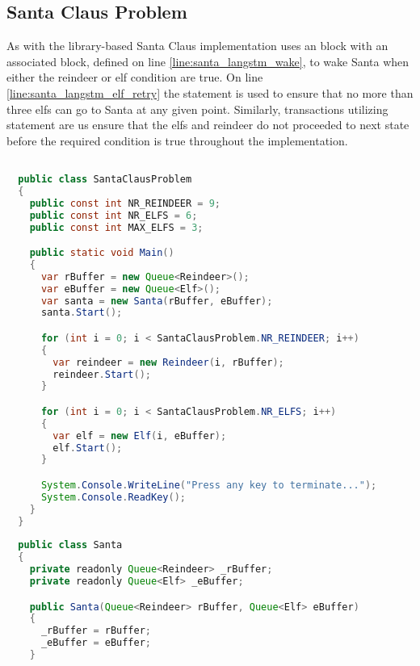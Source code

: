 \subsection{Santa Claus Problem}
As with the library-based Santa Claus implementation \stmname uses an  block with an associated  block, defined on line \ref{line:santa_langstm_wake}, to wake Santa when either the reindeer or elf condition are true. On line \ref{line:santa_langstm_elf_retry} the  statement is used to ensure that no more than three elfs can go to Santa at any given point. Similarly, transactions utilizing  statement are us ensure that the elfs and reindeer do not proceeded to next state before the required condition is true throughout the implementation.

\begin{lstlisting}[label=lst:impl_santa_lang,
  caption={\stmname Based Santa Claus Implementation},
  language=Java,  
  showspaces=false,
  showtabs=false,
  breaklines=true,
  showstringspaces=false,
  breakatwhitespace=true,
  commentstyle=\color{greencomments},
  keywordstyle=\color{bluekeywords},
  stringstyle=\color{redstrings},
  escapechar=~,
  morekeywords={atomic, retry, orelse, var, get, set, ref, out, readonly, virtual, override, region, endregion, foreach, lock}]  % Start your code-block

  public class SantaClausProblem
  {
    public const int NR_REINDEER = 9;
    public const int NR_ELFS = 6;
    public const int MAX_ELFS = 3;

    public static void Main()
    {
      var rBuffer = new Queue<Reindeer>();
      var eBuffer = new Queue<Elf>();
      var santa = new Santa(rBuffer, eBuffer);
      santa.Start();

      for (int i = 0; i < SantaClausProblem.NR_REINDEER; i++)
      {
        var reindeer = new Reindeer(i, rBuffer);
        reindeer.Start();
      }

      for (int i = 0; i < SantaClausProblem.NR_ELFS; i++)
      {
        var elf = new Elf(i, eBuffer);
        elf.Start();
      }

      System.Console.WriteLine("Press any key to terminate...");
      System.Console.ReadKey();
    }
  }
  
  public class Santa
  {
    private readonly Queue<Reindeer> _rBuffer;
    private readonly Queue<Elf> _eBuffer;

    public Santa(Queue<Reindeer> rBuffer, Queue<Elf> eBuffer)
    {
      _rBuffer = rBuffer;
      _eBuffer = eBuffer;
    }
        

\end{lstlisting}
